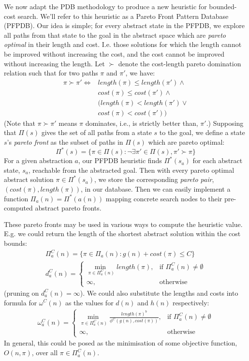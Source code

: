 \documentclass[letterpaper]{article} %
\begin{document}
We now adapt the PDB methodology to produce a new heuristic for bounded-cost search.
We'll refer to this heuristic as a Pareto Front Pattern Database (PFPDB).
Our idea is simple; for every abstract state in the PFPDB,
we explore all paths from that state to the goal in the abstract space which are \textit{pareto optimal} in their length
and cost. I.e. those solutions for which the length cannot be improved without increasing the cost,
and the cost cannot be improved without increasing the length.
Let \(\succ\) denote the cost-length pareto domination relation
such that for two paths \(\pi\) and \(\pi'\), we have:
\begin{align*}
  \pi \succ \pi' \iff &length(\pi) \leq length(\pi') \land \\
  &cost(\pi) \leq cost(\pi') \land \\
  &(length(\pi) < length(\pi') \lor \\
  &cost(\pi) < cost(\pi'))
\end{align*}
(Note that \(\pi \succ \pi'\) means \(\pi\) dominates, i.e., is strictly
better than, \(\pi'\).)
Supposing that \(\Pi(s)\) gives the set of all paths from  a state \(s\) to the goal,
we define a state \(s\)'s \textit{pareto front} as the subset of paths in \(\Pi(s)\) which are pareto optimal:
\[
  \Pi^*(s) = \{\pi \in \Pi(s) : \lnot \exists \pi' \in \Pi(s), \pi' \succ \pi\}
\]
For a given abstraction \(a\),
our PFPDB heuristic finds \(\Pi^*(s_a)\)
for each abstract state, \(s_a\), reachable from the abstracted goal.
Then with every pareto optimal abstract solution \(\pi \in \Pi^*(s_a)\),
we store the corresponding \textit{pareto pair}, \((cost(\pi), length(\pi))\),
in our database.
Then we can easily implement a function \(\Pi_{a}(n) =  \Pi^*(a(n))\)
mapping concrete search nodes to their pre-computed abstract pareto fronts.

These pareto fronts may be used in various ways to compute the heuristic value.
E.g. we could return the length of the shortest abstract solution within the cost bounds:
\begin{align*}
  \Pi^C_a(n) = \{ \pi \in \Pi_a(n) : g(n) + cost(\pi) \leq C\} \\
  d^C_a(n) =
  \begin{cases}
  \underset{\pi \in \Pi^C_a(n) }{\operatorname{min\ }} length(\pi) ,& \text{if } \Pi^C_a(n) \not = \emptyset \\
    \infty ,& \text{otherwise}
  \end{cases}
\end{align*}
(pruning on \(d^C_a(n) = \infty\)).
We could also substitute the lengths and costs into formula for \(\omega^C(n)\)
as the values for \(d(n)\) and \(h(n)\) respectively:
\begin{align*}
  \omega^C_a(n) =
  \begin{cases}
  \underset{\pi \in \Pi^C_a(n) }{\operatorname{min\ }} \frac{length(\pi)^b}{\phi^C(g(n), cost(\pi))} ,& \text{if } \Pi^C_a(n) \not = \emptyset \\
    \infty ,& \text{otherwise}
  \end{cases}
\end{align*}
In general, this could be posed as the minimisation of some objective function, \(O(n, \pi)\),
over all \(\pi \in \Pi^C_a(n)\).
\end{document}
